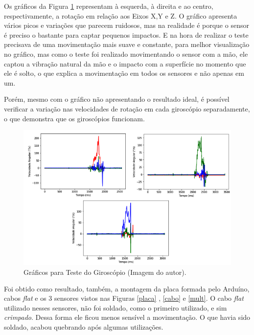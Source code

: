 	Os gráficos da Figura \ref{teste_giro} representam à esquerda, à direita e ao centro, respectivamente, a rotação em relação aos Eixos X,Y e Z. O gráfico apresenta vários picos e variações que parecem ruidosos, mas na realidade é porque o sensor é  preciso o bastante para captar pequenos impactos. E na hora de realizar o teste precisava de uma movimentação mais suave e constante, para melhor visualização no gráfico, mas como o teste foi realizado movimentando o sensor com a mão, ele captou a vibração natural da mão e o impacto com a superfície no momento que ele é solto, o que explica a movimentação em todos os sensores e não apenas em um.
	
	Porém, mesmo com o gráfico não apresentando o resultado ideal, é possível verificar a variação nas velocidades de rotação em cada giroscópio separadamente, o que demonstra que os giroscópios funcionam. 
	
	\begin{figure}[h!]
		\centering
		\includegraphics[keepaspectratio=true,scale=0.7]{figuras/teste_giro.png}
		\caption{Gráficos para Teste do Giroscópio (Imagem do autor).}
		\label{teste_giro}	
			    
	\end{figure}
	
			Foi obtido como resultado, também, a montagem da placa formada pelo Arduíno, cabos \textit{flat } e os 3 sensores vistos nas Figuras \ref{placa} , \ref{cabo} e \ref{mult}. O cabo \textit{flat} utilizado nesses sensores, não foi soldado, como  o primeiro utilizado, e sim \textit{crimpado}. Dessa forma ele ficou menos sensível a movimentação. O que havia sido soldado, acabou quebrando após algumas utilizações. 
		
